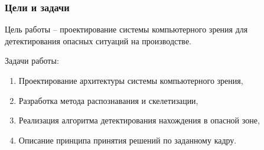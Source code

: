 \begin{frame}
    \frametitle{Цели и задачи}
    Цель работы -- проектирование системы компьютерного зрения для детектирования опасных ситуаций на производстве.

    Задачи работы:
    \begin{enumerate}
        \item Проектирование архитектуры системы компьютерного зрения,
        \item Разработка метода распознавания и скелетизации,
        \item Реализация алгоритма детектирования нахождения в опасной зоне,
        \item Описание принципа принятия решений по заданному кадру.
    \end{enumerate}
\end{frame}
